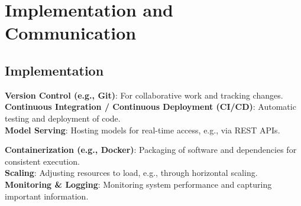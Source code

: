 \documentclass[english, threecolumn]{latex4ei/latex4ei_sheet}
\begin{document}
\section{Implementation and Communication}
\begin{sectionbox}
\subsection{Implementation}
    \textbf{Version Control (e.g., Git)}: For collaborative work and tracking changes.\\
    \textbf{Continuous Integration / Continuous Deployment (CI/CD)}: Automatic testing and deployment of code.\\
    \textbf{Model Serving}: Hosting models for real-time access, e.g., via REST APIs.
    \item \textbf{Containerization (e.g., Docker)}: Packaging of software and dependencies for consistent execution.\\
    \textbf{Scaling}: Adjusting resources to load, e.g., through horizontal scaling.\\
    \textbf{Monitoring \& Logging}: Monitoring system performance and capturing important information.
        

\end{sectionbox}
\end{document}

